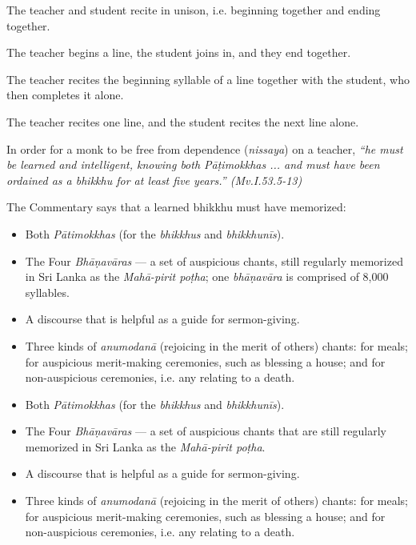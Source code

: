 \ifbfive
\begin{packedenumerate}
  \item The teacher and student recite in unison, i.e. beginning together and ending together.
  \item The teacher begins a line, the student joins in, and they end together.
  \item The teacher recites the beginning syllable of a line together with the student, who then completes it alone.
  \item The teacher recites one line, and the student recites the next line alone.
\end{packedenumerate}
\fi

In order for a monk to be free from dependence (\textit{nissaya}) on a teacher, \textit{``he must be learned and intelligent, knowing both Pāṭimokkhas ... and must have been ordained as a bhikkhu for at least five years.'' (Mv.I.53.5-13)}

The Commentary says that a learned bhikkhu must have memorized:

\ifafive

\begin{itemize}
  \item Both \textit{Pātimokkhas} (for the \textit{bhikkhus} and \textit{bhikkhunīs}).
  \item The Four \textit{Bhāṇavāras} — a set of auspicious chants, still regularly memorized in Sri Lanka as the \textit{Mahā-pirit poṭha}; one \textit{bhāṇavāra} is comprised of 8,000 syllables.
  \item A discourse that is helpful as a guide for sermon-giving.
  \item Three kinds of \textit{anumodanā} (rejoicing in the merit of others) chants: for meals; for auspicious merit-making ceremonies, such as blessing a house; and for non-auspicious ceremonies, i.e. any relating to a death.
\end{itemize}

\fi

\ifninebythirteen

\begin{itemize}
  \item Both \textit{Pātimokkhas} (for the \textit{bhikkhus} and \textit{bhikkhunīs}).
  \item The Four \textit{Bhāṇavāras} — a set of auspicious chants that are still regularly memorized in Sri Lanka as the \textit{Mahā-pirit poṭha}.
  \item A discourse that is helpful as a guide for sermon-giving.
  \item Three kinds of \textit{anumodanā} (rejoicing in the merit of others) chants: for meals; for auspicious merit-making ceremonies, such as blessing a house; and for non-auspicious ceremonies, i.e. any relating to a death.
\end{itemize}

